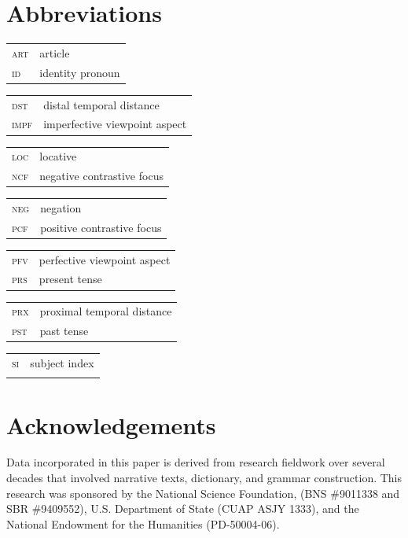 \documentclass[output=paper,colorlinks,citecolor=brown
]{langscibook}
\begin{document}
\section*{Abbreviations}
\begin{tabularx}{.5\textwidth}{@{}lQ@{}}
\textsc{art} & article\\
\textsc{id} & identity pronoun\\
\end{tabularx}%
\begin{tabularx}{.5\textwidth}{@{}lQ@{}}
\textsc{dst} & distal temporal distance\\
\textsc{impf} & imperfective viewpoint aspect\\
\end{tabularx}
\begin{tabularx}{.5\textwidth}{@{}lQ@{}}
\textsc{loc} & locative\\
\textsc{ncf} & negative contrastive focus\\
\end{tabularx}
\begin{tabularx}{.5\textwidth}{@{}lQ@{}}
\textsc{neg} & negation\\
\textsc{pcf} & positive contrastive focus\\
\end{tabularx}
\begin{tabularx}{.5\textwidth}{@{}lQ@{}}
\textsc{pfv} & perfective viewpoint aspect\\
\textsc{prs} & present tense\\
\end{tabularx}
\begin{tabularx}{.5\textwidth}{@{}lQ@{}}
\textsc{prx} & proximal temporal distance\\
\textsc{pst} & past tense\\
\end{tabularx}
\begin{tabularx}{.5\textwidth}{@{}lQ@{}}
\textsc{si} & subject index\\
 \\
\end{tabularx}

\section*{Acknowledgements}
Data incorporated in this paper is derived from research fieldwork over several decades that involved narrative texts, dictionary, and grammar construction. This research was sponsored by the National Science Foundation, (BNS \#9011338 and SBR \#9409552), U.S. Department of State (CUAP ASJY 1333), and the National Endowment for the Humanities (PD-50004-06). 

\sloppy
\printbibliography[heading=subbibliography,notkeyword=this]
\end{document}
